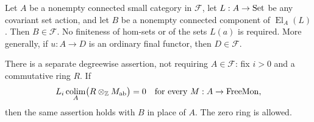 \begin{proposition}
\label{G:actioninheritance}
Let $A$ be a nonempty connected small category in $\mathcal F$,
let $L:A\to\mathrm{Set}$ be any covariant set action, and let $B$ be
a nonempty connected component of $\operatorname{El}_A(L)$.
Then $B\in\mathcal F$. No finiteness of hom-sets or of the
sets $L(a)$ is required. More generally, if $u:A\to D$ is
an ordinary final functor, then $D\in\mathcal F$.

There is a separate degreewise assertion, not requiring
$A\in\mathcal F$: fix $i>0$ and a commutative ring $R$.
If
\[
 L_i\operatorname*{colim}_A\bigl(R\otimes_{\mathbb Z}M_{\mathrm{ab}}\bigr)=0
 \quad\text{for every }M:A\to\mathrm{FreeMon},
\]
then the same assertion holds with $B$ in place of $A$.
The zero ring is allowed.
\end{proposition}
